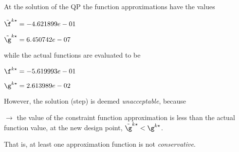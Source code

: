 At the solution of the QP the function approximations have the values

$\tilde \f^{k\star} = -4.621899e-01$

$\tilde \g^{k\star} =  6.450742e-07$

\bigskip
while the actual functions are evaluated to be

$\f^{k\star} = -5.619993e-01$

$\g^{k\star} =  2.613989e-02$

\bigskip
 However, the solution (step)                     is deemed \emph{unacceptable}, because 
 


 $\to$ the value of the constraint function                         approximation is less than the actual function value, at                         the new design point, $\tilde {\g}^{k\star} < {\g}^{k\star}$.

 \bigskip 

 That is, at least one approximation                     function is not \emph{conservative}.
